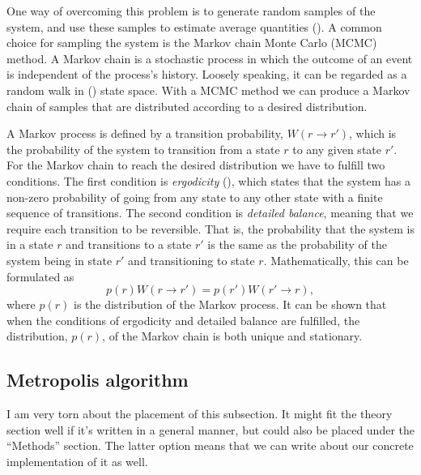 One way of overcoming this problem is to generate random samples of the system, and use these samples to estimate average quantities (). A common choice for sampling the system is the Markov chain Monte Carlo (MCMC) method. A Markov chain is a stochastic process in which the outcome of an event is independent of the process's history. Loosely speaking, it can be regarded as a random walk in () state space. With a MCMC method we can produce a Markov chain of samples that are distributed according to a desired distribution.    

A Markov process is defined by a transition probability, $W(r \to r')$, which is the probability of the system to transition from a state $r$ to any given state $r'$. For the Markov chain to reach the desired distribution we have to fulfill two conditions.  The first condition is \textit{ergodicity} (), which states that the system has a non-zero probability of going from any state to any other state with a finite sequence of transitions. The second condition is \textit{detailed balance}, meaning that we require each transition to be reversible. That is, the probability that the system is in a state $r$ and transitions to a state $r'$ is the same as the probability of the system being in state $r'$ and transitioning to state $r$. Mathematically, this can be formulated as 
\begin{equation}
    p(r)W(r\to r') = p(r') W(r'\to r), \label{eq:detailed_balance}
\end{equation} 
where $p(r)$ is the distribution of the Markov process. It can be shown that when the conditions of ergodicity and detailed balance are fulfilled, the distribution, $p(r)$, of the Markov chain is both unique and stationary. 

\subsection{Metropolis algorithm} \label{subsec_theory:metropolis_algorithm}
\alert{I am very torn about the placement of this subsection. It might fit the theory section well if it's written in a general manner, but could also be placed under the ``Methods'' section. The latter option means that we can write about our concrete implementation of it as well.}

